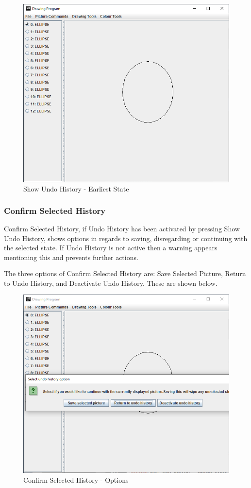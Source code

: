 \documentclass[12pt]{article} %
\begin{document}
\begin{figure}[H]
\caption{Show Undo History - Earliest State}
\centering
\includegraphics[scale=0.75]{pictures/showUndoThirdWindow.PNG}
\end{figure}

\subsubsection{Confirm Selected History}
Confirm Selected History, if Undo History has been activated by pressing Show Undo History, shows options in regards to saving, disregarding or continuing with the selected state. If Undo History is not active then a warning appears mentioning this and prevents further actions. 

The three options of Confirm Selected History are: Save Selected Picture, Return to Undo History, and Deactivate Undo History. These are shown below.

\begin{figure}[H]
\caption{Confirm Selected History - Options}
\centering
\includegraphics[scale=0.75]{pictures/confirmSecondWindow.PNG}
\end{figure}
\end{document}
